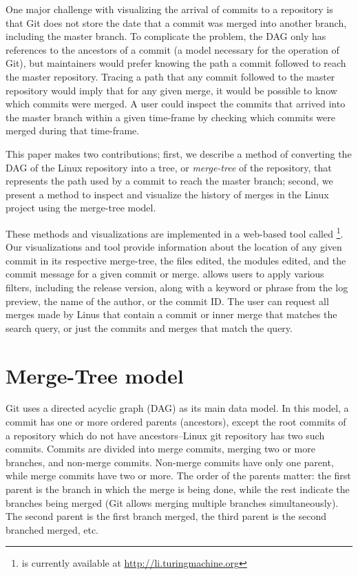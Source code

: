 \documentclass[conference, draftclsnofoot, draft]{IEEEtran}
\begin{document}
One major challenge with visualizing the arrival of commits to a repository is that
Git does not store the date that a commit was merged into another branch, including
the master branch. To complicate the problem, the DAG only has references to the
ancestors of a commit (a model necessary for the operation of Git), but maintainers
would prefer knowing the path a commit followed to reach the master repository.
Tracing a path that any commit followed to the master repository would imply that
for any given merge, it would be possible to know which commits were merged. A user
could inspect the commits that arrived into the master branch within a given
time-frame by checking which commits were merged during that time-frame.

This paper makes two contributions; first, we describe a method of converting the
DAG of the Linux repository into a tree, or \emph{merge-tree} of the repository,
that represents the path used by a commit to reach the master branch; second, we
present a method to inspect and visualize the history of merges in the Linux project
using the merge-tree model.

These methods and visualizations are implemented in a web-based tool called
\tool\footnote{\tool is currently available at \url{http://li.turingmachine.org}}.
Our visualizations and tool provide information about the location of any given
commit in its respective merge-tree, the files edited, the modules edited, and the
commit message for a given commit or merge. \tool allows users to apply various
filters, including the release version, along with a keyword or phrase from the log
preview, the name of the author, or the commit ID. The user can request all merges
made by Linus that contain a commit or inner merge that matches the search query, or
just the commits and merges that match the query.

\section{Merge-Tree model}
\label{sec:mergetree}

Git uses a directed acyclic graph (DAG) as its main data model. In this model, a
commit has one or more ordered parents (ancestors), except the root commits of a
repository which do not have ancestors--Linux git repository has two such commits.
Commits are divided into merge commits, merging two or more branches, and non-merge
commits. Non-merge commits have only one parent, while merge commits have two or
more. The order of the parents matter: the first parent is the branch in which the
merge is being done, while the rest indicate the branches being merged (Git allows
merging multiple branches simultaneously). The second parent is the first branch
merged, the third parent is the second branched merged, etc.
\end{document}
